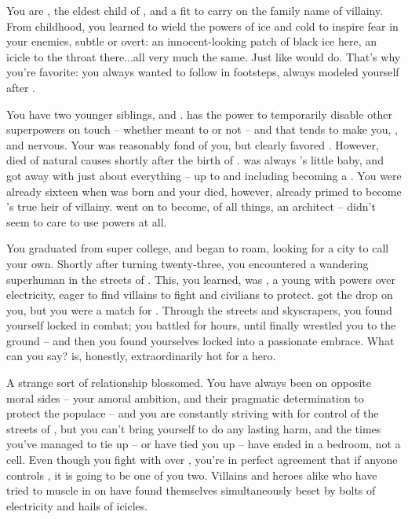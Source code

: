 \documentclass[char]{LRSguildcamp1}
\begin{document}
\name{\cOldest{}}

You are \cOldest{\intro}, the eldest child of \cGrandma{\intro}, and a \cOldest{\offspring} fit to carry on the family name of villainy.  
From childhood, you learned to wield the powers of ice and cold to inspire fear in your enemies, subtle or overt: an innocent-looking patch of black ice here, an icicle to the throat there...all very much the same.  Just like \cGrandma{\Parent} would do.  That's why you're \cGrandma{\their} favorite: you always wanted to follow in \cGrandma{\their} footsteps, always modeled yourself after \cGrandma{\them}. %

You have two younger siblings, \cArchitect{\intro} and \cYoungest{\intro}.  \cArchitect{} has the power to temporarily disable other superpowers on touch -- whether \cArchitect{\they} meant to or not -- and that tends to make you, \cYoungest{}, and \cGrandma{\Parent} nervous.  Your \cGS{\parent} \cGS{\intro} was reasonably fond of you, but clearly favored \cArchitect{}.  However, \cGS{} died of natural causes shortly after the birth of \cYoungest{}. \cYoungest{} was always \cGrandma{\Parent}'s little baby, and got away with just about everything -- up to and including becoming a \cYoungest{\hero}.  You were already sixteen when \cYoungest{} was born and your \cGS{\parent} died, however, already primed to become \cGrandma{\Parent}'s true heir of villainy.  \cArchitect{} went on to become, of all things, an architect -- \cArchitect{\they} didn't seem to care to use \cArchitect{\their} powers at all.

You graduated from super college, and began to roam, looking for a city to call your own.  Shortly after turning twenty-three, you encountered a wandering superhuman in the streets of \pCityO{}.  This, you learned, was \cOS{\intro}, a young \cOS{\hero} with powers over electricity, eager to find villains to fight and civilians to protect.  \cOS{\They} got the drop on you, but you were a match for \cOS{\them}.   Through the streets and skyscrapers, you found yourself locked in combat; you battled for hours, until \cOS{\they} finally wrestled you to the ground -- and then you found yourselves locked into a passionate embrace.  What can you say?  \cOS{} is, honestly, extraordinarily hot for a hero.

A strange sort of relationship blossomed.  You have always been on opposite moral sides -- your amoral ambition, and their pragmatic determination to protect the populace -- and you are constantly striving with \cOS{\them} for control of the streets of \pCityO{}, but you can't bring yourself to do \cOS{\them} any lasting harm, and the times you've managed to tie \cOS{\them} up -- or \cOS{\they} have tied you up -- have ended in a bedroom, not a cell.
Even though you fight with \cOS{} over \pCityO{}, you're in perfect agreement that if anyone controls \pCityO{}, it is going to be one of you two.  Villains and heroes alike who have tried to muscle in on \pCityO{} have found themselves simultaneously beset by bolts of electricity and hails of icicles.
\end{document}
